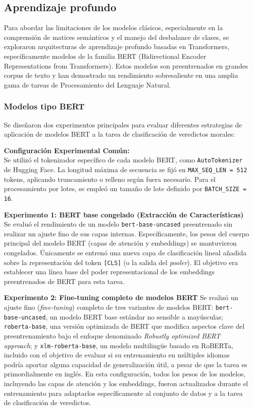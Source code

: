 \subsection{Aprendizaje profundo}
Para abordar las limitaciones de los modelos clásicos, especialmente en la comprensión de matices semánticos y el manejo del desbalance de clases, se exploraron arquitecturas de aprendizaje profundo basadas en Transformers, específicamente modelos de la familia BERT (Bidirectional Encoder Representations from Transformers). Estos modelos son preentrenados en grandes corpus de texto y han demostrado un rendimiento sobresaliente en una amplia gama de tareas de Procesamiento del Lenguaje Natural.

\subsubsection{Modelos tipo BERT}
Se diseñaron dos experimentos principales para evaluar diferentes estrategias de aplicación de modelos BERT a la tarea de clasificación de veredictos morales:

\textbf{Configuración Experimental Común:}
\\
Se utilizó el tokenizador específico de cada modelo BERT, como \texttt{AutoTokenizer} de Hugging Face. La longitud máxima de secuencia se fijó en \texttt{MAX\_SEQ\_LEN = 512} tokens, aplicando truncamiento o relleno según fuera necesario. Para el procesamiento por lotes, se empleó un tamaño de lote definido por \texttt{BATCH\_SIZE = 16}.


\textbf{Experimento 1: BERT base congelado (Extracción de Características)}
Se evaluó el rendimiento de un modelo \texttt{bert-base-uncased} preentrenado sin realizar un ajuste fino de sus capas internas. Específicamente, los pesos del cuerpo principal del modelo BERT (capas de atención y embeddings) se mantuvieron congelados. Únicamente se entrenó una nueva capa de clasificación lineal añadida sobre la representación del token \texttt{[CLS]} (o la salida del \textit{pooler}). El objetivo era establecer una línea base del poder representacional de los embeddings preentrenados de BERT para esta tarea.

\textbf{Experimento 2: Fine-tuning completo de modelos BERT}
Se realizó un ajuste fino (\textit{fine-tuning}) completo de tres variantes de modelos BERT: \texttt{bert-base-uncased}, un modelo BERT base estándar no sensible a mayúsculas; \texttt{roberta-base}, una versión optimizada de BERT que modifica aspectos clave del preentrenamiento bajo el enfoque denominado \textit{Robustly optimized BERT approach}; y \texttt{xlm-roberta-base}, un modelo multilingüe basado en RoBERTa, incluido con el objetivo de evaluar si su entrenamiento en múltiples idiomas podría aportar alguna capacidad de generalización útil, a pesar de que la tarea es primordialmente en inglés. En esta configuración, todos los pesos de los modelos, incluyendo las capas de atención y los embeddings, fueron actualizados durante el entrenamiento para adaptarlos específicamente al conjunto de datos y a la tarea de clasificación de veredictos.



